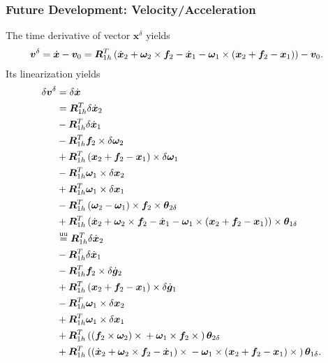 \documentclass[10pt,dvips,fleqn,subeqn]{report}
\newcommand{\T}[1]{\bm{#1}}
\newcommand{\TT}[1]{\bm{#1}}
\newcommand{\equu}{\overset{\text{uu}}{=}}
\begin{document}
\subsubsection{Future Development: Velocity/Acceleration}
The time derivative of vector $\T{x}^{\delta}$ yields
\begin{align}
	\T{v}^{\delta}
	&=
	\dot{\T{x}}
	-
	\T{v}_0
	=
	\TT{R}_{1h}^T \plbr{
		\dot{\T{x}}_2
		+
		\T{\omega}_2 \times \T{f}_2
		-
		\dot{\T{x}}_1
		-
		\T{\omega}_1 \times \plbr{
			\T{x}_2
			+
			\T{f}_2
			-
			\T{x}_1
		}
	}
	-
	\T{v}_0
	.
\end{align}
Its linearization yields
\begin{align}
	\delta\T{v}^{\delta}
	&=
	\delta\dot{\T{x}}
	\nonumber \\
	&=
	\TT{R}_{1h}^T \delta\dot{\T{x}}_2
	\nonumber \\
	&-
	\TT{R}_{1h}^T \delta\dot{\T{x}}_1
	\nonumber \\
	&-
	\TT{R}_{1h}^T \T{f}_2 \times \delta\T{\omega}_2
	\nonumber \\
	&+
	\TT{R}_{1h}^T \plbr{
		\T{x}_2
		+
		\T{f}_2
		-
		\T{x}_1
	} \times \delta\T{\omega}_1
	\nonumber \\
	&-
	\TT{R}_{1h}^T \T{\omega}_1 \times \delta\T{x}_2
	\nonumber \\
	&+
	\TT{R}_{1h}^T \T{\omega}_1 \times \delta\T{x}_1
	\nonumber \\
	&-
	\TT{R}_{1h}^T \plbr{\T{\omega}_2 - \T{\omega}_1} \times \T{f}_2 \times \T{\theta}_{2\delta}
	\nonumber \\
	&+
	\TT{R}_{1h}^T \plbr{
		\dot{\T{x}}_2
		+
		\T{\omega}_2 \times \T{f}_2
		-
		\dot{\T{x}}_1
		-
		\T{\omega}_1 \times \plbr{
			\T{x}_2
			+
			\T{f}_2
			-
			\T{x}_1
		}
	} \times \T{\theta}_{1\delta}
	\nonumber \\
	&\equu
	\TT{R}_{1h}^T \delta\dot{\T{x}}_2
	\nonumber \\
	&-
	\TT{R}_{1h}^T \delta\dot{\T{x}}_1
	\nonumber \\
	&-
	\TT{R}_{1h}^T \T{f}_2 \times \delta\dot{\T{g}}_2
	\nonumber \\
	&+
	\TT{R}_{1h}^T \plbr{
		\T{x}_2
		+
		\T{f}_2
		-
		\T{x}_1
	} \times \delta\dot{\T{g}}_1
	\nonumber \\
	&-
	\TT{R}_{1h}^T \T{\omega}_1 \times \delta\T{x}_2
	\nonumber \\
	&+
	\TT{R}_{1h}^T \T{\omega}_1 \times \delta\T{x}_1
	\nonumber \\
	&+
	\TT{R}_{1h}^T \plbr{
		\plbr{\T{f}_2 \times \T{\omega}_2} \times{}
		+
		\T{\omega}_1 \times \T{f}_2 \times{}
	}
	\T{\theta}_{2\delta}
	\nonumber \\
	&+
	\TT{R}_{1h}^T \plbr{
		\plbr{
			\dot{\T{x}}_2
			+
			\T{\omega}_2 \times \T{f}_2
			-
			\dot{\T{x}}_1
		} \times{}
		-
		\T{\omega}_1 \times \plbr{
			\T{x}_2
			+
			\T{f}_2
			-
			\T{x}_1
		} \times{}
	} \T{\theta}_{1\delta}
	.
\end{align}
\end{document}
